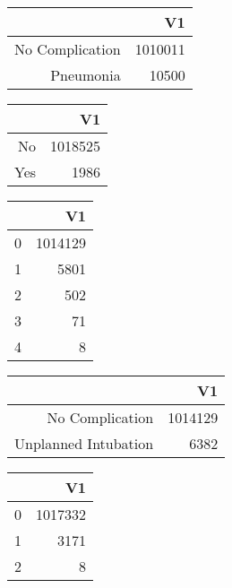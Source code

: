 \bigskip\bigskip
\centering
\begin{tabular}{rr}
  \hline
 & V1 \\ 
  \hline
No Complication & 1010011 \\ 
  Pneumonia & 10500 \\ 
   \hline
\end{tabular}

\bigskip\bigskip
\centering
\begin{tabular}{rr}
  \hline
 & V1 \\ 
  \hline
No & 1018525 \\ 
  Yes & 1986 \\ 
   \hline
\end{tabular}

\bigskip\bigskip
\centering
\begin{tabular}{rr}
  \hline
 & V1 \\ 
  \hline
0 & 1014129 \\ 
  1 & 5801 \\ 
  2 & 502 \\ 
  3 &  71 \\ 
  4 &   8 \\ 
   \hline
\end{tabular}

\bigskip\bigskip
\centering
\begin{tabular}{rr}
  \hline
 & V1 \\ 
  \hline
No Complication & 1014129 \\ 
  Unplanned Intubation & 6382 \\ 
   \hline
\end{tabular}

\bigskip\bigskip
\centering
\begin{tabular}{rr}
  \hline
 & V1 \\ 
  \hline
0 & 1017332 \\ 
  1 & 3171 \\ 
  2 &   8 \\ 
   \hline
\end{tabular}

